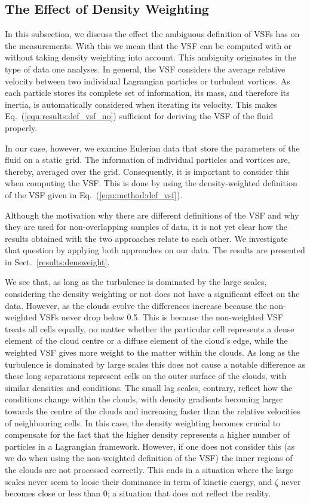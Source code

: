 \subsection{The Effect of Density Weighting}\label{discussion:densweight}

In this subsection, we discuss the effect the ambiguous definition of VSFs has on the measurements. 
With this we mean that the VSF can be computed with or without taking density weighting into account.
This ambiguity originates in the type of data one analyses.
In general, the VSF considers the average relative velocity between two individual Lagrangian particles or turbulent vortices.
As each particle stores its complete set of information, its mass, and therefore its inertia, is automatically considered when iterating its velocity.
This makes Eq.~(\ref{equ:results:def_vsf_no}) sufficient for deriving the VSF of the fluid properly.

In our case, however, we examine Eulerian data that store the parameters of the fluid on a static grid. 
The information of individual particles and vortices are, thereby, averaged over the grid.
Consequently, it is important to consider this when computing the VSF.
This is done by using the density-weighted definition of the VSF given in Eq.~(\ref{equ:method:def_vsf}).

Although the motivation why there are different definitions of the VSF and why they are used for non-overlapping samples of data, it is not yet clear how the results obtained with the two approaches relate to each other. 
We investigate that question by applying both approaches on our data.
The results are presented in Sect.~\ref{results:densweight}.

We see that, as long as the turbulence is dominated by the large scales, considering the density weighting or not does not have a significant effect on the data. 
However, as the clouds evolve the differences increase because the non-weighted VSFs never drop below 0.5.
This is because the non-weighted VSF treats all cells equally, no matter whether the particular cell represents a dense element of the cloud centre or a diffuse element of the cloud's edge, while the weighted VSF gives more weight to the matter within the clouds.
As long as the turbulence is dominated by large scales this does not cause a notable difference as these long separations represent cells on the outer surface of the clouds, with similar densities and conditions.
The small lag scales, contrary, reflect how the conditions change within the clouds, with density gradients becoming larger towards the centre of the clouds and increasing faster than the relative velocities of neighbouring cells.
In this case, the density weighting becomes crucial to compensate for the fact that the higher density represents a higher number of particles in a Lagrangian framework.
However, if one does not consider this (as we do when using the non-weighted definition of the VSF) the inner regions of the clouds are not processed correctly.
This ends in a situation where the large scales never seem to loose their dominance in term of kinetic energy, and $\zeta$ never becomes close or less than 0; a situation that does not reflect the reality.

